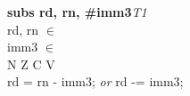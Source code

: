 


\begin{instructionblock}{\imagewidth}%
    \textbf{subs rd, rn, \#imm3}\hfill\textit{T1}\\
    rd, rn $\in$ \baseregisters\\
    imm3 $\in$ \immThree\\
    {N Z C V}\\
    rd = rn - imm3; \textit{or} rd -= imm3;
\end{instructionblock}

